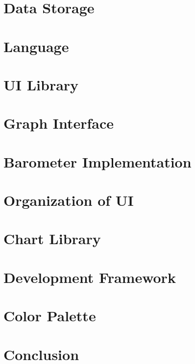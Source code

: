 \documentclass[onecolumn, draftclsnofoot,10pt, compsoc]{IEEEtran}
\begin{document}
\section{Data Storage}

\section{Language}

\section{UI Library}

\section{Graph Interface}

\section{Barometer Implementation}

\section{Organization of UI}

\section{Chart Library}

\section{Development Framework}

\section{Color Palette}

\section{Conclusion}

\newpage


\end{document}
